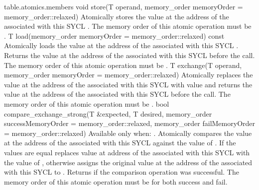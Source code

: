 {table.atomics.members}
  \addRowTwoL
    { void store(T operand, memory_order memoryOrder = }
    { memory_order::relaxed) }
    {
      Atomically stores the value  at the address of the
       associated with this SYCL . The
      memory order of this atomic operation must be .
    }
  \addRowTwoL
    { T load(memory_order memoryOrder = }
    { memory_order::relaxed) const }
    {
      Atomically loads the value at the address of the 
      associated with this SYCL . Returns the value at the
      address of the  associated with this SYCL
       before the call. The memory order of this atomic
      operation must be .
    }
  \addRowTwoL
    { T exchange(T operand, memory_order memoryOrder = }
    { memory_order::relaxed) }
    {
      Atomically replaces the value at the address of the 
      associated with this SYCL  with value  and returns the value at the address of the  associated with this SYCL  before the call.
      The memory order of this atomic operation must be .
    }
  \addRowFiveL
    { bool compare_exchange_strong(T \&expected, T desired, }
    { memory_order successMemoryOrder = }
    { memory_order::relaxed, }
    { memory_order failMemoryOrder = }
    { memory_order::relaxed) }
    {
      Available only when: .
      \newline
      Atomically compares the value at the address of the 
      associated with this SYCL  against the value of
      . If the values are equal replaces value at address
      of the  associated with this SYCL  with the value of , otherwise assigns the
      original value at the address of the  associated
      with this SYCL  to . Returns
       if the comparison operation was successful. The memory
      order of this atomic operation must be  for both success and fail.
    }
